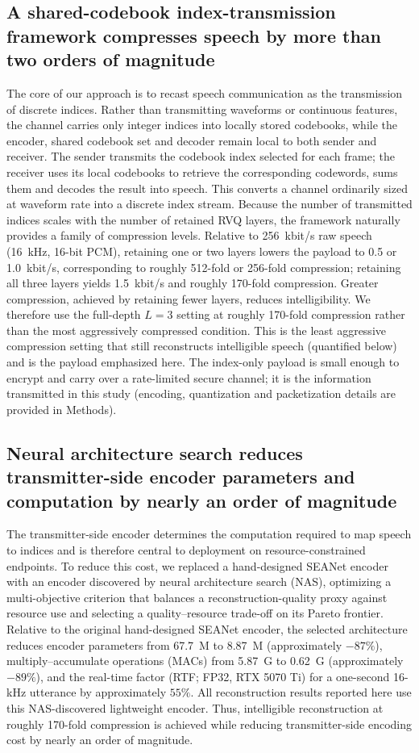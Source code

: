 \documentclass[final,5p,times,twocolumn]{elsarticle}
\begin{document}
\subsection{A shared-codebook index-transmission framework compresses speech by more than two orders of magnitude}
The core of our approach is to recast speech communication as the transmission of discrete indices. Rather than transmitting waveforms or continuous features, the channel carries only integer indices into locally stored codebooks, while the encoder, shared codebook set and decoder remain local to both sender and receiver. The sender transmits the codebook index selected for each frame; the receiver uses its local codebooks to retrieve the corresponding codewords, sums them and decodes the result into speech. This converts a channel ordinarily sized at waveform rate into a discrete index stream. Because the number of transmitted indices scales with the number of retained RVQ layers, the framework naturally provides a family of compression levels. Relative to 256~kbit/s raw speech (16~kHz, 16-bit PCM), retaining one or two layers lowers the payload to 0.5 or 1.0~kbit/s, corresponding to roughly 512-fold or 256-fold compression; retaining all three layers yields 1.5~kbit/s and roughly 170-fold compression. Greater compression, achieved by retaining fewer layers, reduces intelligibility. We therefore use the full-depth $L=3$ setting at roughly 170-fold compression rather than the most aggressively compressed condition. This is the least aggressive compression setting that still reconstructs intelligible speech (quantified below) and is the payload emphasized here. The index-only payload is small enough to encrypt and carry over a rate-limited secure channel; it is the information transmitted in this study (encoding, quantization and packetization details are provided in Methods).

\subsection{Neural architecture search reduces transmitter-side encoder parameters and computation by nearly an order of magnitude}
The transmitter-side encoder determines the computation required to map speech to indices and is therefore central to deployment on resource-constrained endpoints. To reduce this cost, we replaced a hand-designed SEANet encoder with an encoder discovered by neural architecture search (NAS), optimizing a multi-objective criterion that balances a reconstruction-quality proxy against resource use and selecting a quality--resource trade-off on its Pareto frontier. Relative to the original hand-designed SEANet encoder, the selected architecture reduces encoder parameters from 67.7~M to 8.87~M (approximately $-87\%$), multiply--accumulate operations (MACs) from 5.87~G to 0.62~G (approximately $-89\%$), and the real-time factor (RTF; FP32, RTX 5070 Ti) for a one-second 16-kHz utterance by approximately $55\%$. All reconstruction results reported here use this NAS-discovered lightweight encoder. Thus, intelligible reconstruction at roughly 170-fold compression is achieved while reducing transmitter-side encoding cost by nearly an order of magnitude.
\end{document}
